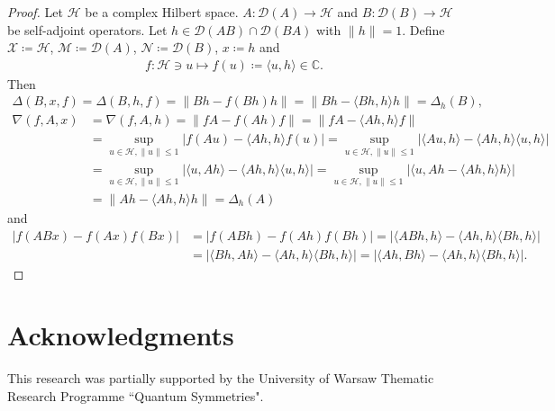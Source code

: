 \documentclass{amsart}
\begin{document}
\begin{proof}
Let $\mathcal{H}$ be a complex Hilbert space.	  $A:	\mathcal{D}(A)\to  \mathcal{H}$ and $B:	\mathcal{D}(B)\to  \mathcal{H}$  be self-adjoint operators. Let  $h \in \mathcal{D}(AB)\cap  \mathcal{D}(BA)$ with $\|h\|=1$. Define $\mathcal{X}\coloneqq \mathcal{H}$, $\mathcal{M}\coloneqq \mathcal{D}(A)$, $\mathcal{N}\coloneqq \mathcal{D}(B)$, $x\coloneqq h$ and 
\begin{align*}
	f:\mathcal{H}\ni u \mapsto f(u)\coloneqq\langle u, h \rangle \in \mathbb{C}.
\end{align*}
Then 
\begin{align*}
\Delta (B, x, f)=\Delta (B, h,f)= \|Bh-f(Bh) h\|= \|Bh-\langle Bh, h \rangle h \|=	\Delta _h(B), 
\end{align*}
\begin{align*}
	\nabla(f, A,x)&=\nabla(f, A,h)=\|fA-f(Ah) f\|=\|fA-\langle Ah, h \rangle f\|\\
	&=\sup_{u \in \mathcal{H}, \|u\|\leq 1}|f(Au)-\langle Ah, h \rangle f(u)|=\sup_{u \in \mathcal{H}, \|u\|\leq 1}|\langle Au, h \rangle -\langle Ah, h \rangle \langle u, h \rangle |\\
	&=\sup_{u \in \mathcal{H}, \|u\|\leq 1}|\langle u, Ah \rangle -\langle Ah, h \rangle \langle u, h \rangle |=\sup_{u \in \mathcal{H}, \|u\|\leq 1}|\langle u, Ah -\langle Ah, h \rangle h \rangle |\\
	&=\|Ah -\langle Ah, h \rangle h\|=	\Delta _h(A)
\end{align*}
and 
\begin{align*}
|f(ABx)-f(Ax)f(Bx)|&=|f(ABh)-f(Ah)f(Bh)|=|\langle ABh, h \rangle-\langle Ah, h \rangle \langle Bh, h \rangle|\\
&=|\langle Bh, Ah \rangle-\langle Ah, h \rangle \langle Bh, h \rangle|=|\langle Ah, Bh \rangle-\langle Ah, h \rangle \langle Bh, h \rangle|.
\end{align*}
\end{proof}
\section{Acknowledgments}
This research was partially supported by the University of Warsaw Thematic Research Programme ``Quantum Symmetries".



 
 
 
\end{document}
